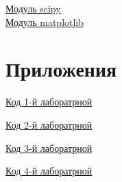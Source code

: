 \documentclass[a4]{article}
\begin{document}
	\href{https://www.scipy.org/}{Модуль scipy}\\
		
	\href{https://matplotlib.org/}{Модуль matplotlib}\\
	
	\section{Приложения}
	
	\href{https://github.com/dmitry-maltsov/PolyMatStat/blob/master/1/lab1.py}{Код 1-й лаборатрной}
	
	\href{https://github.com/dmitry-maltsov/PolyMatStat/blob/master/2/lab2.py}{Код 2-й лаборатрной}
	
	\href{https://github.com/dmitry-maltsov/PolyMatStat/blob/master/3/lab3.py}{Код 3-й лаборатрной}
	
	\href{https://github.com/dmitry-maltsov/PolyMatStat/blob/master/4/lab4.py}{Код 4-й лаборатрной}
	
	
\end{document}
